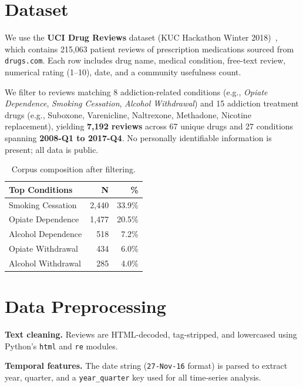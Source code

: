 \documentclass[10pt,twocolumn]{article}
\begin{document}
\section{Dataset}
We use the \textbf{UCI Drug Reviews} dataset (KUC Hackathon Winter
2018)~\cite{grasser2018}, which contains 215,063 patient reviews of
prescription medications sourced from \texttt{drugs.com}. Each row
includes drug name, medical condition, free-text review, numerical rating
(1--10), date, and a community usefulness count.

We filter to reviews matching 8 addiction-related conditions (e.g.,
\textit{Opiate Dependence}, \textit{Smoking Cessation}, \textit{Alcohol
Withdrawal}) and 15 addiction treatment drugs (e.g., Suboxone,
Varenicline, Naltrexone, Methadone, Nicotine replacement), yielding
\textbf{7,192 reviews} across 67 unique drugs and 27 conditions spanning
\textbf{2008-Q1 to 2017-Q4}. No personally identifiable information is
present; all data is public.

\begin{table}[h]
\centering
\caption{Corpus composition after filtering.}
\small
\begin{tabular}{lrr}
\toprule
\textbf{Top Conditions} & \textbf{N} & \textbf{\%} \\
\midrule
Smoking Cessation   & 2{,}440 & 33.9\% \\
Opiate Dependence   & 1{,}477 & 20.5\% \\
Alcohol Dependence  &   518 &  7.2\% \\
Opiate Withdrawal   &   434 &  6.0\% \\
Alcohol Withdrawal  &   285 &  4.0\% \\
\bottomrule
\end{tabular}
\label{tab:corpus}
\end{table}

\section{Data Preprocessing}
\textbf{Text cleaning.} Reviews are HTML-decoded, tag-stripped, and
lowercased using Python's \texttt{html} and \texttt{re} modules.

\textbf{Temporal features.} The date string (\texttt{27-Nov-16} format) is
parsed to extract year, quarter, and a \texttt{year\_quarter} key used for
all time-series analysis.
\end{document}
